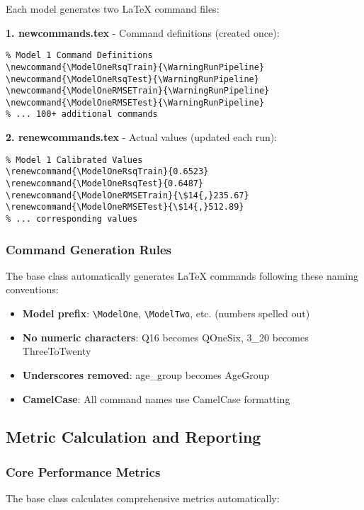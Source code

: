 Each model generates two LaTeX command files:

\textbf{1. newcommands.tex} - Command definitions (created once):
\begin{verbatim}
% Model 1 Command Definitions
\newcommand{\ModelOneRsqTrain}{\WarningRunPipeline}
\newcommand{\ModelOneRsqTest}{\WarningRunPipeline}
\newcommand{\ModelOneRMSETrain}{\WarningRunPipeline}
\newcommand{\ModelOneRMSETest}{\WarningRunPipeline}
% ... 100+ additional commands
\end{verbatim}

\textbf{2. renewcommands.tex} - Actual values (updated each run):
\begin{verbatim}
% Model 1 Calibrated Values
\renewcommand{\ModelOneRsqTrain}{0.6523}
\renewcommand{\ModelOneRsqTest}{0.6487}
\renewcommand{\ModelOneRMSETrain}{\$14{,}235.67}
\renewcommand{\ModelOneRMSETest}{\$14{,}512.89}
% ... corresponding values
\end{verbatim}

\subsubsection{Command Generation Rules}

The base class automatically generates LaTeX commands following these naming conventions:

\begin{itemize}
    \item \textbf{Model prefix}: \verb|\ModelOne|, \verb|\ModelTwo|, etc. (numbers spelled out)
    \item \textbf{No numeric characters}: Q16 becomes QOneSix, 3\_20 becomes ThreeToTwenty
    \item \textbf{Underscores removed}: age\_group becomes AgeGroup
    \item \textbf{CamelCase}: All command names use CamelCase formatting
\end{itemize}

\subsection{Metric Calculation and Reporting}

\subsubsection{Core Performance Metrics}

The base class calculates comprehensive metrics automatically:

